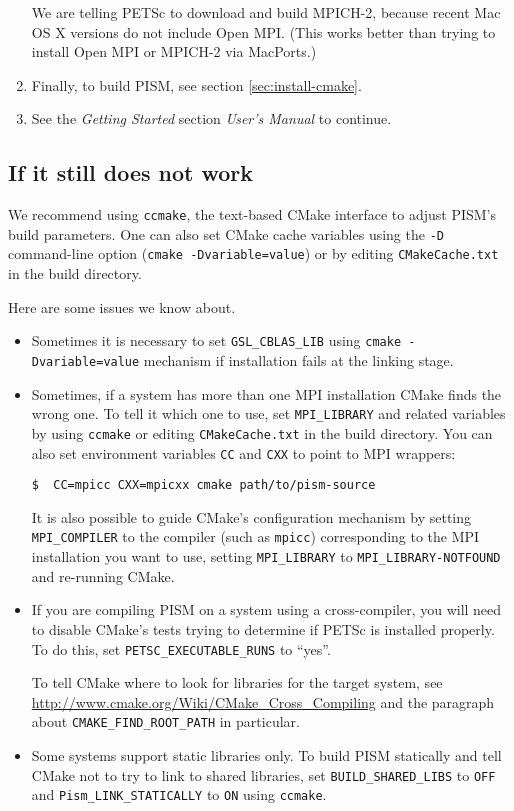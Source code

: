 \documentclass[titlepage,letterpaper,final]{scrartcl}
\begin{document}
\begin{enumerate}
We are telling PETSc to download and build MPICH-2, because recent Mac OS X
versions do not include Open MPI. (This works better than trying to install
Open MPI or MPICH-2 via MacPorts.)

\item Finally, to build PISM, see section \ref{sec:install-cmake}.

\item See the \emph{Getting Started} section \emph{User's Manual} to continue.
\end{enumerate}

\subsection{If it still does not work}
\label{subsec:config}

We recommend using \texttt{ccmake}, the text-based CMake interface to adjust
PISM's build parameters. One can also set CMake cache variables using the
\texttt{-D} command-line option (\texttt{cmake -Dvariable=value}) or by editing
\texttt{CMakeCache.txt} in the build directory.

Here are some issues we know about.
\begin{itemize}
\item Sometimes it is necessary to set \texttt{GSL_CBLAS_LIB} using
  \texttt{cmake -Dvariable=value} mechanism if installation fails at the
  linking stage.
\item Sometimes, if a system has more than one MPI installation CMake finds the
  wrong one. To tell it which one to use, set \texttt{MPI_LIBRARY} and related
  variables by using \texttt{ccmake} or editing \texttt{CMakeCache.txt} in the
  build directory. You can also set environment variables \texttt{CC} and
  \texttt{CXX} to point to MPI wrappers:
\begin{verbatim}
$  CC=mpicc CXX=mpicxx cmake path/to/pism-source
\end{verbatim}

  It is also possible to guide CMake's configuration mechanism by setting
  \texttt{MPI_COMPILER} to the compiler (such as \texttt{mpicc}) corresponding
  to the MPI installation you want to use, setting \texttt{MPI_LIBRARY} to
  \texttt{MPI_LIBRARY-NOTFOUND} and re-running CMake.
\item If you are compiling PISM on a system using a cross-compiler, you will
  need to disable CMake's tests trying to determine if PETSc is installed
  properly. To do this, set \texttt{PETSC_EXECUTABLE_RUNS} to ``yes''.

  To tell CMake where to look for libraries for the target system, see
  \url{http://www.cmake.org/Wiki/CMake_Cross_Compiling} and the paragraph about
  \texttt{CMAKE_FIND_ROOT_PATH} in particular.
\item Some systems support static libraries only. To build PISM statically and
  tell CMake not to try to link to shared libraries, set
  \texttt{BUILD_SHARED_LIBS} to \texttt{OFF} and \texttt{Pism_LINK_STATICALLY}
  to \texttt{ON} using \texttt{ccmake}.
\end{itemize}
\end{document}
